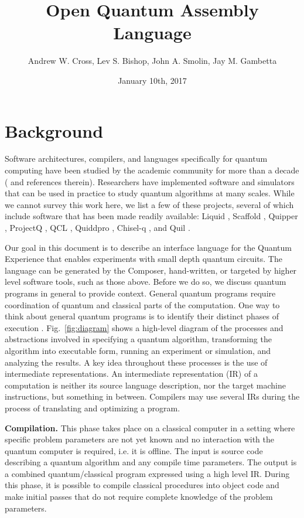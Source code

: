 \documentclass[USenglish,12pt,fleqn]{article} %
\begin{document}
\title{Open Quantum Assembly Language}
\author{Andrew W. Cross, Lev S. Bishop, John A. Smolin, Jay M. Gambetta}
\date{January 10th, 2017}

\maketitle

\section{Background}

Software architectures, compilers, and languages specifically for quantum computing have been studied by the academic community for more than a decade (\cite{selinger04,gay06,svore06,haner16} and references therein). Researchers have implemented software and simulators that can be used in practice to study quantum algorithms at many scales. While we cannot survey this work here, we list a few of these projects, several of which include software that has been made readily available: Liquid \cite{ws14,liquid}, Scaffold \cite{scaffold,scaffcc}, Quipper \cite{valiron15,quipper,green13}, ProjectQ \cite{steiger16,projectq}, QCL \cite{omer03,qcl}, Quiddpro \cite{quiddpro,viamontes05}, Chisel-q \cite{chiselq,chisel}, and Quil \cite{Quil,smith16}.

Our goal in this document is to describe an interface language for the Quantum Experience that enables experiments with small depth quantum circuits. The language can be generated by the Composer, hand-written, or targeted by higher level software tools, such as those above. Before we do so, we discuss quantum programs in general to provide context. General quantum programs require coordination of quantum and classical parts of the computation. One way to think about general quantum programs is to identify their distinct phases of execution \cite{green13}. Fig.~\ref{fig:diagram} shows a high-level diagram of the processes and abstractions involved in specifying a quantum algorithm, transforming the algorithm into executable form, running an experiment or simulation, and analyzing the results. A key idea throughout these processes is the use of intermediate representations. An intermediate representation (IR) of a computation is neither its source language description, nor the target machine instructions, but something in between. Compilers may use several IRs during the process of translating and optimizing a program.

{\bf Compilation.} This phase takes place on a classical computer in a setting where specific problem parameters are not yet known and no interaction with the quantum computer is required, i.e. it is offline. The input is source code describing a quantum algorithm and any compile time parameters. The output is a combined quantum/classical program expressed using a high level IR. During this phase, it is possible to compile classical procedures into object code and make initial passes that do not require complete knowledge of the problem parameters.
\end{document}
